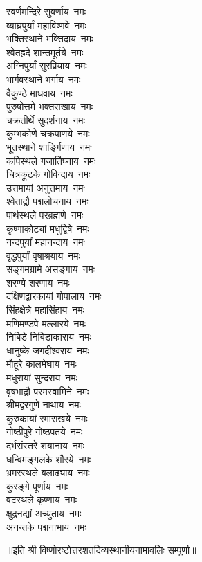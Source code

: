 \begin{multicols}{2}
\begin{flushleft}
स्वर्णमन्दिरे सुवर्णाय~नमः\\
व्याघ्रपुर्यां महाविष्णवे~नमः\\
भक्तिस्थाने भक्तिदाय~नमः\\
श्वेतह्रदे शान्तमूर्तये~नमः\\
अग्निपुर्यां सुरप्रियाय~नमः\\
भार्गवस्थाने भर्गाय~नमः\\
वैकुण्ठे माधवाय~नमः\hfill{}\\
पुरुषोत्तमे भक्तसखाय~नमः\\
चक्रतीर्थे सुदर्शनाय~नमः\\
कुम्भकोणे चक्रपाणये~नमः\\
भूतस्थाने शार्ङ्गिणाय~नमः\\
कपिस्थले गजार्तिघ्नाय~नमः\\
चित्रकूटके गोविन्दाय~नमः\\
उत्तमायां अनुत्तमाय~नमः\\
श्वेताद्रौ पद्मलोचनाय~नमः\\
पार्थस्थले परब्रह्मणे~नमः\\
कृष्णाकोट्यां मधुद्विषे~नमः\hfill{}\\
नन्दपुर्यां महानन्दाय~नमः\\
वृद्धपुर्यां वृषाश्रयाय~नमः\\
सङ्गमग्रामे असङ्गाय~नमः\\
शरण्ये शरणाय~नमः\\
दक्षिणद्वारकायां गोपालाय~नमः\\
सिंहक्षेत्रे महासिंहाय~नमः\\
मणिमण्डपे मल्लारये~नमः\\
निबिडे निबिडाकाराय~नमः\\
धानुष्के जगदीश्वराय~नमः\\
मौहूरे कालमेघाय~नमः\hfill{}\\
मधुरायां सुन्दराय~नमः\\
वृषभाद्रौ परमस्वामिने~नमः\\
श्रीमद्वरगुणे नाथाय~नमः\\
कुरुकायां रमासखये~नमः\\
गोष्ठीपुरे गोष्ठपतये~नमः\\
दर्भसंस्तरे शयानाय~नमः\\
धन्विमङ्गलके शौरये~नमः\\
भ्रमरस्थले बलाढ्याय~नमः\\
कुरङ्गे पूर्णाय~नमः\\
वटस्थले कृष्णाय~नमः\hfill{}\\
क्षुद्रनद्यां अच्युताय~नमः\\
अनन्तके पद्मनाभाय~नमः\\
\end{flushleft}
\end{multicols}
॥इति श्री विष्णोरष्टोत्तरशतदिव्यस्थानीयनामावलिः सम्पूर्णा॥
